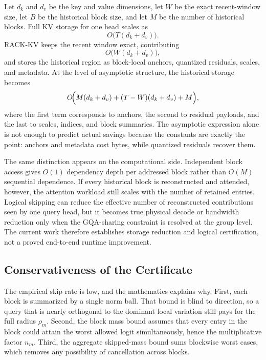 Let \(d_k\) and \(d_v\) be the key and value dimensions, let \(W\) be the exact recent-window size, let \(B\) be the historical block size, and let \(M\) be the number of historical blocks. Full KV storage for one head scales as
\begin{equation}
  O\!\bigl(T(d_k+d_v)\bigr).
\end{equation}
RACK-KV keeps the recent window exact, contributing
\begin{equation}
  O\!\bigl(W(d_k+d_v)\bigr),
\end{equation}
and stores the historical region as block-local anchors, quantized residuals, scales, and metadata. At the level of asymptotic structure, the historical storage becomes
\begin{equation}
  O\!\Bigl(
    M(d_k+d_v)
    +
    (T-W)(d_k+d_v)
    +
    M
  \Bigr),
\end{equation}
where the first term corresponds to anchors, the second to residual payloads, and the last to scales, indices, and block summaries. The asymptotic expression alone is not enough to predict actual savings because the constants are exactly the point: anchors and metadata cost bytes, while quantized residuals recover them.

The same distinction appears on the computational side. Independent block access gives \(O(1)\) dependency depth per addressed block rather than \(O(M)\) sequential dependence. If every historical block is reconstructed and attended, however, the attention workload still scales with the number of retained entries. Logical skipping can reduce the effective number of reconstructed contributions seen by one query head, but it becomes true physical decode or bandwidth reduction only when the GQA-sharing constraint is resolved at the group level. The current work therefore establishes storage reduction and logical certification, not a proved end-to-end runtime improvement.

\subsection{Conservativeness of the Certificate}
\label{sec:conservative}

The empirical skip rate is low, and the mathematics explains why. First, each block is summarized by a single norm ball. That bound is blind to direction, so a query that is nearly orthogonal to the dominant local variation still pays for the full radius \(\rho_m\). Second, the block mass bound assumes that every entry in the block could attain the worst allowed logit simultaneously, hence the multiplicative factor \(n_m\). Third, the aggregate skipped-mass bound sums blockwise worst cases, which removes any possibility of cancellation across blocks.

